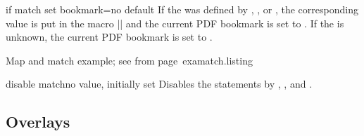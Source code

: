 \documentclass[a4paper,11pt]{ltxdoc}
\begin{document}
\begin{docIgrKey}{if match set bookmark}{=}{no default}
  If the  was defined by ,
  , or ,
  the corresponding value is put in the
  macro |\igrmatchvalue| and the current PDF bookmark is set to .
  If the  is unknown, the current PDF bookmark is set to .
\begin{texexptitled}%
  {Map and match example; see from page~\pageref{examatch.1}}{examatch.listing}
\end{texexptitled}
\end{docIgrKey}

\begin{docIgrKey}{disable match}{}{no value, initially set}
  Disables the statements by
  ,
  , and
  .
\end{docIgrKey}

\clearpage

\subsection{Overlays}
\end{document}
